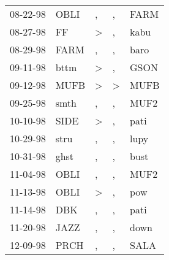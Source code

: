 \begin{supertabular}{p{0.07\textwidth}p{0.06\textwidth}p{0.02\textwidth}p{0.02\textwidth}p{0.06\textwidth}}
          08-22-98\textsuperscript{} &           OBLI\textsuperscript{} &                , &                , &           FARM\textsuperscript{} \\
          08-27-98\textsuperscript{} &             FF\textsuperscript{} &     \textgreater &                , &           kabu\textsuperscript{} \\
          08-29-98\textsuperscript{} &           FARM\textsuperscript{} &                , &                , &           baro\textsuperscript{} \\
          09-11-98\textsuperscript{} &           bttm\textsuperscript{} &     \textgreater &                , &           GSON\textsuperscript{} \\
          09-12-98\textsuperscript{} &           MUFB\textsuperscript{} &     \textgreater &     \textgreater &           MUFB\textsuperscript{} \\
          09-25-98\textsuperscript{} &           smth\textsuperscript{} &                , &                , &           MUF2\textsuperscript{} \\
          10-10-98\textsuperscript{} &           SIDE\textsuperscript{} &     \textgreater &                , &           pati\textsuperscript{} \\
          10-29-98\textsuperscript{} &           stru\textsuperscript{} &                , &                , &           lupy\textsuperscript{} \\
          10-31-98\textsuperscript{} &           ghst\textsuperscript{} &                , &                , &           bust\textsuperscript{} \\
          11-04-98\textsuperscript{} &           OBLI\textsuperscript{} &                , &                , &           MUF2\textsuperscript{} \\
          11-13-98\textsuperscript{} &           OBLI\textsuperscript{} &     \textgreater &                , &            pow\textsuperscript{} \\
          11-14-98\textsuperscript{} &            DBK\textsuperscript{} &                , &                , &           pati\textsuperscript{} \\
          11-20-98\textsuperscript{} &           JAZZ\textsuperscript{} &                , &                , &           down\textsuperscript{} \\
          12-09-98\textsuperscript{} &           PRCH\textsuperscript{} &                , &                , &           SALA\textsuperscript{} \\

\end{supertabular}
